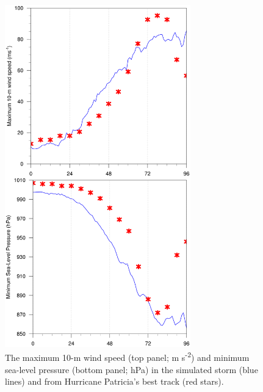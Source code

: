 \documentclass{ametsoc}
\begin{document}
\begin{figure}[ht]
\centerline{\includegraphics[width=19pc]{figures/fig01_vmax+pmin.png}}
\caption{The maximum 10-m wind speed (top panel; m s\textsuperscript{-2}) and minimum sea-level pressure (bottom panel; hPa) in the simulated storm (blue lines) and from Hurricane Patricia's best track (red stars).}
\label{fig:vmax+pmin}
\end{figure}
\end{document}

